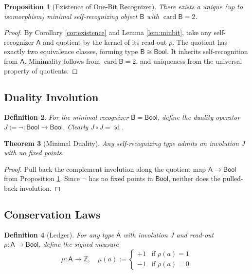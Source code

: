 \documentclass[12pt,a4paper]{article}
\newtheorem{theorem}{Theorem}
\newtheorem{proposition}[theorem]{Proposition}
\newtheorem{definition}[theorem]{Definition}
\DeclareMathOperator{\card}{card}
\DeclareMathOperator{\id}{id}
\newcommand{\Z}{\mathbb{Z}}
\newcommand{\Bool}{\mathsf{Bool}}
\begin{document}
\begin{proposition}[Existence of One-Bit Recognizer]\label{prop:onebit}
There exists a unique (up to isomorphism) minimal self-recognizing object $\mathsf{B}$ with $\card \mathsf{B} = 2$.
\end{proposition}

\begin{proof}
By Corollary \ref{cor:existence} and Lemma \ref{lem:minbit}, take any self-recognizer $\mathsf{A}$ and quotient by the kernel of its read-out $\rho$. The quotient has exactly two equivalence classes, forming type $\mathsf{B} \cong \Bool$. It inherits self-recognition from $\mathsf{A}$. Minimality follows from $\card \mathsf{B} = 2$, and uniqueness from the universal property of quotients.
\end{proof}

\subsection{Duality Involution}

\begin{definition}
For the minimal recognizer $\mathsf{B} = \Bool$, define the duality operator $J := \neg : \Bool \to \Bool$. Clearly $J \circ J = \id$.
\end{definition}

\begin{theorem}[Minimal Duality]\label{thm:duality}
Any self-recognizing type admits an involution $J$ with no fixed points.
\end{theorem}

\begin{proof}
Pull back the complement involution along the quotient map $\mathsf{A} \to \Bool$ from Proposition \ref{prop:onebit}. Since $\neg$ has no fixed points in $\Bool$, neither does the pulled-back involution.
\end{proof}

\subsection{Conservation Laws}

\begin{definition}[Ledger]
For any type $\mathsf{A}$ with involution $J$ and read-out $\rho : \mathsf{A} \to \Bool$, define the signed measure
\[
\mu : \mathsf{A} \to \Z, \quad \mu(a) := \begin{cases}
+1 & \text{if } \rho(a) = 1 \\
-1 & \text{if } \rho(a) = 0
\end{cases}
\]
\end{definition}
\end{document}
